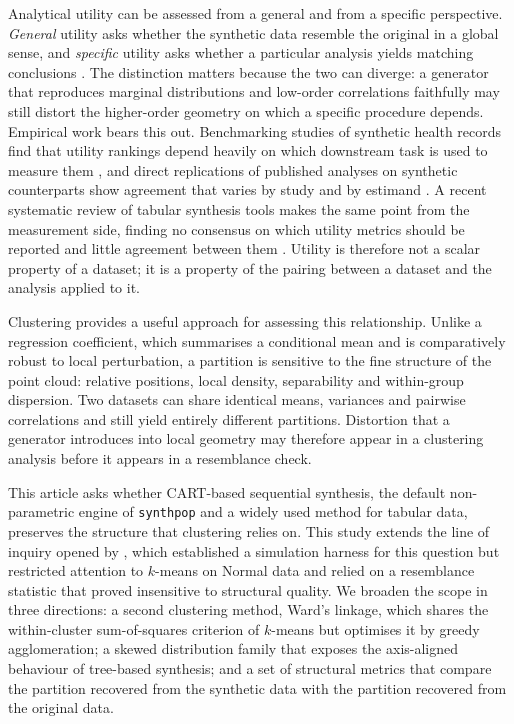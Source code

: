 \documentclass[pdflatex,referee]{sn-jnl}
\begin{document}
Analytical utility can be assessed from a general and from a specific
perspective. \emph{General} utility asks whether the synthetic data resemble
the original in a global sense, and \emph{specific} utility asks whether a
particular analysis yields matching conclusions \citep{snoke2018}. The
distinction matters because the two can diverge: a generator that reproduces
marginal distributions and low-order correlations faithfully may still distort
the higher-order geometry on which a specific procedure depends. Empirical work
bears this out. Benchmarking studies of synthetic health records find that
utility rankings depend heavily on which downstream task is used to measure
them \citep{yan2022,elemam2022}, and direct replications of published analyses
on synthetic counterparts show agreement that varies by study and by estimand
\citep{reinerbenaim2020}. A recent systematic review of tabular synthesis tools
makes the same point from the measurement side, finding no consensus on which
utility metrics should be reported and little agreement between them
\citep{lautrup2024}. Utility is therefore not a scalar property of a dataset;
it is a property of the pairing between a dataset and the analysis applied to
it.

Clustering provides a useful approach for assessing this relationship. Unlike
a regression coefficient, which summarises a conditional mean and is
comparatively robust to local perturbation, a partition is sensitive to the
fine structure of the point cloud: relative positions, local density,
separability and within-group dispersion. Two datasets can share identical
means, variances and pairwise correlations and still yield entirely different
partitions. Distortion that a generator introduces into local geometry may
therefore appear in a clustering analysis before it appears in a resemblance
check.

This article asks whether CART-based sequential synthesis, the default
non-parametric engine of \texttt{synthpop} \citep{nowok2016} and a widely used
method for tabular data, preserves the structure that clustering relies on.
This study extends the line of inquiry opened by , which
established a simulation harness for this question but restricted attention to
$k$-means on Normal data and relied on a resemblance statistic that proved
insensitive to structural quality. We broaden the scope in three directions: a
second clustering method, Ward's linkage, which shares the within-cluster
sum-of-squares criterion of $k$-means but optimises it by greedy agglomeration;
a skewed distribution family that exposes the axis-aligned behaviour of
tree-based synthesis; and a set of structural metrics that compare the
partition recovered from the synthetic data with the partition recovered from
the original data.
\end{document}
